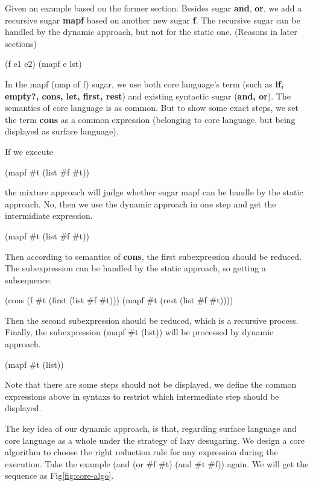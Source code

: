 Given an example based on the former section. Besides sugar {\bfseries and}, {\bfseries or}, we add a recursive sugar {\bfseries mapf} based on another new sugar {\bfseries f}. The recursive sugar can be handled by the dynamic approach, but not for the static one. (Reasons in later sections)
\begin{Codes}
\small{(f e1 e2)} 
\small{(mapf e lst)}  
\end{Codes}

In the mapf (map of f) sugar, we use both core language's term (such as {\bfseries if, empty?, cons, let, first, rest}) and existing syntactic sugar ({\bfseries and, or}). The semantics of core language is as common. But to show some exact steps, we set the term {\bfseries cons} as a common expression (belonging to core language, but being displayed as surface language).


If we execute 
\begin{Codes}
(mapf \#t (list \#f \#t))
\end{Codes}
 the mixture approach will judge whether sugar mapf can be handle by the static approach. No, then we use the dynamic approach in one step and get the intermidiate expression.
\begin{Codes}
    (mapf \#t (list \#f \#t))
\end{Codes}
Then according to semantics of {\bfseries cons}, the first subexpression should be reduced. The subexpression can be handled by the static approach, so getting a subsequence.
\begin{Codes}
    (cons (f \#t (first (list \#f \#t))) (mapf \#t (rest (list \#f \#t))))
\end{Codes}
Then the second subexpression should be reduced, which is a recursive process. Finally, the subexpression (mapf \#t (list)) will be processed by dynamic approach.
\begin{Codes}
    (mapf \#t (list))
\end{Codes}
Note that there are some steps should not be displayed, we define the common expressions above in syntaxs to restrict which intermediate step should be displayed.


The key idea of our dynamic approach, is that, regarding surface language and core language as a whole under the strategy of lazy desugaring. We design a core algorithm to choose the right reduction rule for any expression during the execution. Take the example 
(and (or \#f \#t) (and \#t \#f)) again. We will get the sequence as Fig\ref{fig:core-algo}.

